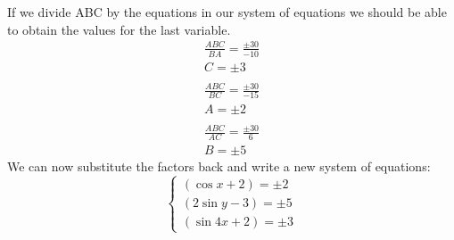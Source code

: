 \documentclass[a4paper,12pt]{article}
\begin{document}
If we divide ABC by the equations in our system of equations we should be able to obtain the values for the last variable.
\begin{equation}
    \begin{split}
        \frac{ABC}{BA}=\frac{\pm 30}{-10} \\
        C = \pm 3 \\ \\
        \frac{ABC}{BC}=\frac{\pm 30}{-15} \\
        A = \pm 2 \\ \\ 
        \frac{ABC}{AC}=\frac{\pm 30}{6} \\
        B = \pm 5
    \end{split}
\end{equation}
We can now substitute the factors back and write a new system of equations: \newline
$$
\begin{cases}
    (\cos x+2) = \pm 2 \\
    (2\sin y-3) = \pm 5 \\
    (\sin 4x+2) = \pm 3 
\end{cases}
$$
\end{document}
